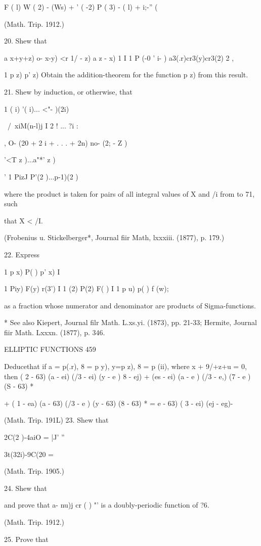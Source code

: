 {F ( l) W ( 2) - (Ws) + ' ( -2) P ( 3) - ( l) + i;-'' (%

(Math. Trip. 1912.)

20. Shew that

a x+y+z) o- x-y) <r 1/ - z) a z - x) 1 I 1 P (-0 ' i- )
a3(.r)cr3(y)cr3(2) 2 ,

1 p z) p' z) Obtain the addition-theorem for the function p z) from
this result.

21. Shew by induction, or otherwise, that

1 ( i) '( i)... <"- )(2i)

\ /\ xiM(n-l)j I 2 ! ... ?i :

, O- (20 + 2 i + . . . + 2n) no- (2; - Z )

'<T z )...a"*' z )

' 1 PizJ P'(2 )...p-1)(2 )

where the product is taken for pairs of all integral values of X and
/i from to 71, such

that X < /I.

(Frobenius u. Stickelberger*, Journal fiir Math, lxxxiii. (1877), p.
179.)

22. Express

1 p x) P( ) p' x) I

1 Piy) F(y) r(3') I 1 (2) P(2) F( ) I 1 p u) p( ) f (w);

as a fraction whose numerator and denominator are products of
Sigma-functions.

* See also Kiepert, Journal filr Math. L.xs.yi. (1873), pp. 21-33;
Hermite, Journal fiir Math. Lxxxn. (1877), p. 346.

ELLIPTIC FUNCTIONS 459

Deducethat if a = p(.r), 8 = p y), y=p z), 8 = p (ii), where x +
9/+z+u = 0, then ( 2 - 63) (a - ei) (/3 - ei) (y - e ) 8 - ej) + (es -
ei) (a - e ) (/3 - e,) (7 - e ) (S - 63) *

+ ( 1 - ea) (a - 63) (/3 - e ) (y - 63) (8 - 63) * = e - 63) ( 3 - ei)
(ej - eg)-

(Math. Trip. 191L) 23. Shew that

2C(2 )-4aiO = |J' ''

3t(32i)-9C(20 =

(Math. Trip. 1905.)

24. Shew that

and prove that a- nu)j cr ( ) "' is a doubly-periodic function of ?6.

(Math. Trip. 1912.)

25. Prove that

}
